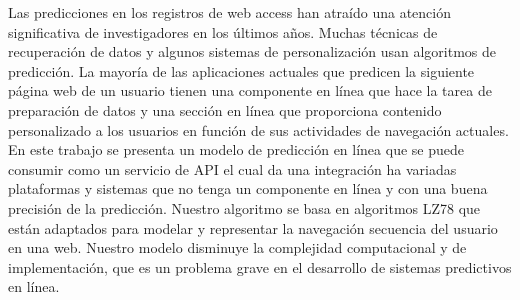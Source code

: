 {Las predicciones en los registros de web access han atraído una atención significativa de investigadores en los últimos años. Muchas técnicas de recuperación de datos y algunos sistemas de personalización usan algoritmos de predicción. La mayoría de las aplicaciones actuales que predicen la siguiente página web de un usuario tienen una componente en línea que hace la tarea de preparación de datos y una sección en línea que proporciona contenido personalizado a los usuarios en función de sus actividades de navegación actuales. En este trabajo se presenta un modelo de predicción en línea que se puede consumir como un servicio de API el cual da una integración ha variadas plataformas y sistemas que no tenga un componente en línea y con una buena precisión de la predicción. Nuestro algoritmo se basa en algoritmos LZ78 que están adaptados para modelar y representar la navegación secuencia del usuario en una web. Nuestro modelo disminuye la complejidad computacional y de implementación, que es un problema grave en el desarrollo de sistemas predictivos en línea.


  }








